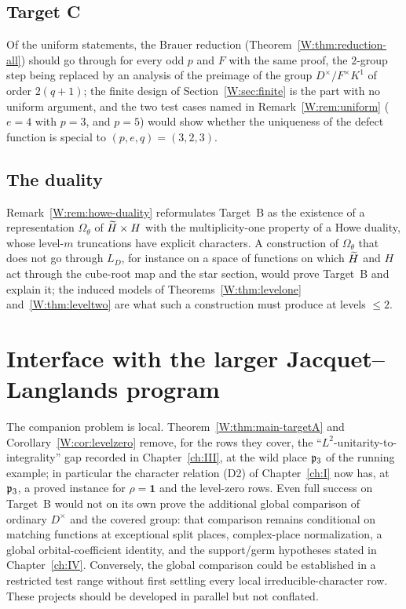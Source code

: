 \subsection{Target C}
Of the uniform statements, the Brauer reduction (Theorem~\ref{W:thm:reduction-all})
should go through for every odd $p$ and $F$ with the same proof, the
$2$-group step being replaced by an analysis of the preimage of the
group $D^\times/F^\times K^1$ of order $2(q+1)$; the finite design of
Section~\ref{W:sec:finite} is the part with no uniform argument, and the
two test cases named in Remark~\ref{W:rem:uniform} ($e=4$ with $p=3$, and
$p=5$) would show whether the uniqueness of the defect function is
special to $(p,e,q)=(3,2,3)$.

\subsection{The duality}
Remark~\ref{W:rem:howe-duality} reformulates Target~B as the existence of
a representation $\Omega_\theta$ of $\widetilde H\times H$ with the
multiplicity-one property of a Howe duality, whose level-$m$
truncations have explicit characters.  A construction of
$\Omega_\theta$ that does not go through $L_D$, for instance on a space
of functions on which $\widetilde H$ and $H$ act through the cube-root map and
the star section, would prove Target~B and explain it; the induced
models of Theorems~\ref{W:thm:levelone} and~\ref{W:thm:leveltwo} are what
such a construction must produce at levels $\le2$.

\section{Interface with the larger Jacquet--Langlands program}
The companion problem is local.  Theorem~\ref{W:thm:main-targetA} and
Corollary~\ref{W:cor:levelzero} remove, for the rows they cover, the
``$L^2$-unitarity-to-integrality'' gap recorded in Chapter~\ref{ch:III},
at the wild place $\mathfrak p_3$ of the running example; in particular the
character relation (D2) of Chapter~\ref{ch:I} now has, at $\mathfrak p_3$, a proved
instance for $\rho=\mathbf1$ and the level-zero rows.  Even full
success on Target~B would not on its own prove the additional global
comparison of ordinary $D^\times$ and the covered group: that comparison
remains conditional on matching functions at exceptional split places,
complex-place normalization, a global orbital-coefficient identity,
and the support/germ hypotheses stated in Chapter~\ref{ch:IV}.  Conversely, the
global comparison could be established in a restricted test range
without first settling every local irreducible-character row.  These
projects should be developed in parallel but not conflated.

